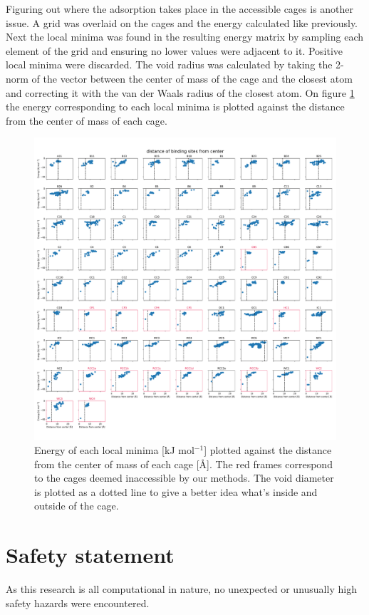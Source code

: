 \documentclass[journal=jacsat,manuscript=article]{achemso}
\begin{document}
{Figuring out where the adsorption takes place in the accessible cages is another issue. A grid was overlaid on the cages and the energy calculated like previously. Next the local minima was found in the resulting energy matrix by sampling each element of the grid and ensuring no lower values were adjacent to it. Positive local minima were discarded. The void radius was calculated by taking the 2-norm of the vector between the center of mass of the cage and the closest atom and correcting it with the van der Waals radius of the closest atom. On figure \ref{fig:energy_vs_dist} the energy corresponding to each local minima is plotted against the distance from the center of mass of each cage.}

\begin{figure}
\centering
	\includegraphics[width=\columnwidth]{../distance_of_binding_sites.pdf}
	\caption{{\color{red}Energy of each local minima [kJ mol$^{-1}$] plotted against the distance from the center of mass of each cage [\AA]. The red frames correspond to the cages deemed inaccessible by our methods. The void diameter is plotted as a dotted line to give a better idea what's inside and outside of the cage.}
	} \label{fig:energy_vs_dist}
\end{figure}




\clearpage

\section{Safety statement}
As this research is all computational in nature, no unexpected or unusually high safety hazards were encountered.

\clearpage


\end{document}
